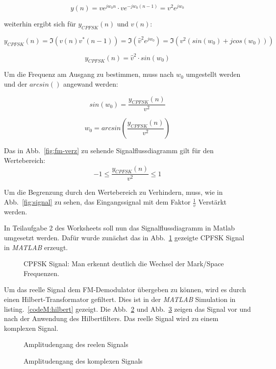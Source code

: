 \documentclass{article}
\begin{document}
$$
y(n) = v e^{j w_0 n} \cdot v e^{-j w_0 (n-1)} = v^2 e^{j w_0}
$$

weiterhin ergibt sich für $y_{CPFSK}(n)$ und $v(n)$:

$$
y_{CPFSK}(n) = \Im(v(n) v^\ast(n-1)) = \Im( \hat{v}^2 e^{j w_0}) = \Im(v^2 (sin(w_0) + j cos(w_0)))
$$

$$
y_{CPFSK}(n) = \hat{v}^2 \cdot sin(w_0)
$$

Um die Frequenz am Ausgang zu bestimmen, muss nach $w_0$ umgestellt werden und der $arcsin()$ angewand werden:

$$
sin(w_0) = \frac{y_{CPFSK}(n)}{v^2}
$$

$$
w_0 = arcsin(\frac{y_{CPFSK}(n)}{v^2})
$$

Das in Abb.~\ref{fig:fm-verz} zu sehende Signalflussdiagramm gilt für den Wertebereich:
$$
-1 \leq  \frac{y_{CPFSK}(n)}{v^2} \leq 1
$$

Um die Begrenzung durch den Wertebereich zu Verhindern, muss, wie in Abb.~\ref{fig:signal} zu sehen, 
das Eingangssignal mit dem Faktor $\frac{1}{v}$ Verstärkt werden.

In Teilaufgabe 2 des Worksheets soll nun das Signalflussdiagramm in Matlab umgesetzt werden.
Dafür wurde zunächst das in Abb.~\ref{fig:cpfsk} gezeigte CPFSK Signal in \textit{MATLAB} erzeugt.


\begin{figure}[!h]
    \centering
    \def\svgscale{0.5}
    \def\svgwidth{0.8\columnwidth}
%    
    \caption{CPFSK Signal: Man erkennt deutlich die Wechsel der Mark/Space Frequenzen.}
    \label{fig:cpfsk}
\end{figure}

Um das reelle Signal dem FM-Demodulator übergeben zu können, wird es durch einen Hilbert-Transformator gefiltert.
Dies ist in der \textit{MATLAB} Simulation in listing.~\ref{codeM:hilbert} gezeigt. Die  Abb.~\ref{fig:hilbert_vor} und Abb.~\ref{fig:hilbert_nach} zeigen das Signal vor und nach 
der Anwendung des Hilbertfilters. Das reelle Signal wird zu einem komplexen Signal. 

\begin{figure}[!h]
    \centering
    \def\svgscale{0.5}
    \def\svgwidth{0.8\columnwidth}
%    
    \caption{Amplitudengang des reelen Signals}
    \label{fig:hilbert_vor}
\end{figure}

\begin{figure}[!h]
    \centering
    \def\svgscale{0.5}
    \def\svgwidth{0.8\columnwidth}
%    
    \caption{Amplitudengang des komplexen Signals}
    \label{fig:hilbert_nach}
\end{figure}
\end{document}
